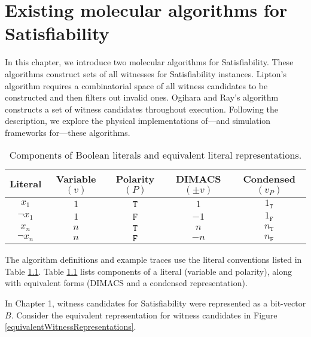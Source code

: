 \chapter{Existing molecular algorithms for {\sc Satisfiability}}


In this chapter, we introduce two molecular algorithms for {\sc Satisfiability}.  These algorithms construct sets of all witnesses for {\sc Satisfiability} instances.  Lipton's algorithm requires a combinatorial space of all witness candidates to be constructed and then filters out invalid ones.  Ogihara and Ray's algorithm constructs a set of witness candidates throughout execution.  Following the description, we explore the physical implementations of---and simulation frameworks for---these algorithms.

\begin{table}[htdp]
\caption{Components of Boolean literals and equivalent literal representations.}
\begin{center}
\begin{tabular}{| c | c | c | c | c |}
\hline
\textbf{Literal} & \textbf{Variable} $(v)$ & \textbf{Polarity} $(P)$ & \textbf{DIMACS} $(\pm v)$ & \textbf{Condensed} $(v_P)$ \\ \hline	
$x_1$ & $1$ & $\texttt{T}$ & $1$ & $1_{\texttt{T}}$ \\
$\neg x_1$ & $1$ & $\texttt{F}$ & $-1$ & $1_{\texttt{F}}$ \\
$x_n$ & $n$ & $\texttt{T}$ & $n$ & $n_{\texttt{T}}$ \\
$\neg x_n$ & $n$ & $\texttt{F}$ & $-n$ & $n_{\texttt{F}}$ \\ \hline
\end{tabular}
\end{center}
\label{equivalentLiteralTable}
\end{table}%

The algorithm definitions and example traces use the literal conventions listed in Table \ref{equivalentLiteralTable}.  Table \ref{equivalentLiteralTable} lists components of a literal (variable and polarity), along with equivalent forms (DIMACS and a condensed representation).  

In Chapter 1, witness candidates for {\sc Satisfiability} were represented as a bit-vector $B$.  Consider the equivalent representation for witness candidates in Figure \ref{equivalentWitnessRepresentations}.

